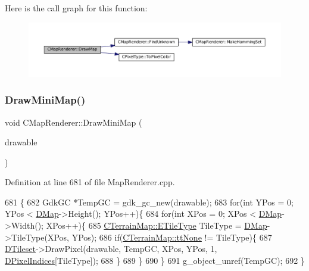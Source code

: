 Here is the call graph for this function\+:
\nopagebreak
\begin{figure}[H]
\begin{center}
\leavevmode
\includegraphics[width=350pt]{classCMapRenderer_a26786befd5d6d0b09210736916d1b912_cgraph}
\end{center}
\end{figure}
\hypertarget{classCMapRenderer_ae5c68b6a4892eb8b9e7a4d8afb4e344e}{}\label{classCMapRenderer_ae5c68b6a4892eb8b9e7a4d8afb4e344e} 
\subsubsection{\texorpdfstring{Draw\+Mini\+Map()}{DrawMiniMap()}}
{\footnotesize\ttfamily void C\+Map\+Renderer\+::\+Draw\+Mini\+Map (\begin{DoxyParamCaption}\item[{Gdk\+Drawable $\ast$}]{drawable }\end{DoxyParamCaption})}



Definition at line 681 of file Map\+Renderer.\+cpp.


\begin{DoxyCode}
681                                                    \{
682     GdkGC *TempGC = gdk\_gc\_new(drawable);
683     \textcolor{keywordflow}{for}(\textcolor{keywordtype}{int} YPos = 0; YPos < \hyperlink{classCMapRenderer_ab9a199c61aa1c87a3248af3085d8ba52}{DMap}->Height(); YPos++)\{
684         \textcolor{keywordflow}{for}(\textcolor{keywordtype}{int} XPos = 0; XPos < \hyperlink{classCMapRenderer_ab9a199c61aa1c87a3248af3085d8ba52}{DMap}->Width(); XPos++)\{
685             \hyperlink{classCTerrainMap_aff2ab991e237269941416dd79d8871d4}{CTerrainMap::ETileType} TileType = \hyperlink{classCMapRenderer_ab9a199c61aa1c87a3248af3085d8ba52}{DMap}->TileType(XPos, YPos);
686             \textcolor{keywordflow}{if}(\hyperlink{classCTerrainMap_aff2ab991e237269941416dd79d8871d4a481e779132fb16414d17870bd6229eb5}{CTerrainMap::ttNone} != TileType)\{
687                 \hyperlink{classCMapRenderer_ace0648cba050b5e02431096edd15b836}{DTileset}->DrawPixel(drawable, TempGC, XPos, YPos, 1, 
      \hyperlink{classCMapRenderer_af636936c20248c3ee6cb6ec46f18f077}{DPixelIndices}[TileType]);
688             \}
689         \}
690     \}
691     g\_object\_unref(TempGC);
692 \}
\end{DoxyCode}
\hypertarget{classCMapRenderer_aec3c1d3294ac3af8ebb717ed5be88870}{}\label{classCMapRenderer_aec3c1d3294ac3af8ebb717ed5be88870} 
